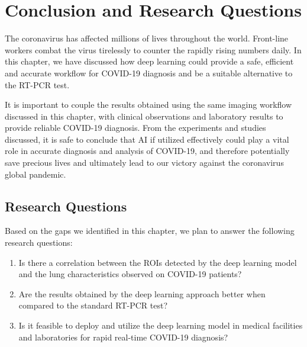\section{Conclusion and Research Questions}
The coronavirus has affected millions of lives throughout the world. 
Front-line workers combat the virus tirelessly to counter 
the rapidly rising numbers daily. In this chapter, we have discussed 
how deep learning could provide a safe, efficient and accurate 
workflow for COVID-19 diagnosis and be a suitable alternative to 
the RT-PCR test.


It is important to couple the results obtained 
using the same imaging workflow discussed in this chapter, with clinical 
observations and laboratory results to provide reliable COVID-19 diagnosis.
From the experiments and studies discussed, it is safe to conclude 
that AI if utilized effectively could play a vital role in 
accurate diagnosis and analysis of COVID-19, and therefore potentially 
save precious lives and ultimately lead to our victory against the coronavirus
global pandemic.
\vspace{-1em}
\subsection*{Research Questions}
Based on the gaps we identified in this chapter, we plan to answer the following research questions:

\begin{enumerate}
  \item Is there a correlation between the ROIs detected by the deep learning model and the lung characteristics observed on COVID-19 patients?
  \item Are the results obtained by the deep learning approach better when compared to the standard RT-PCR test?
  \item Is it feasible to deploy and utilize the deep learning model in medical facilities and laboratories for rapid real-time COVID-19 diagnosis?
\end{enumerate}